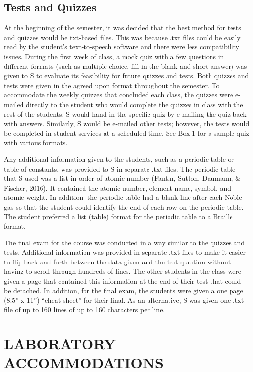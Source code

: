 \documentclass[11.5pt]{sig-alternate} %
\begin{document}
\begin{large}
\subsection*{Tests and Quizzes}

At the beginning of the semester, it was decided that the best method for tests and quizzes would be txt-based files.  This was because .txt files could be easily read by the student’s text-to-speech software and there were less compatibility issues.  During the first week of class, a mock quiz with a few questions in different formats (such as multiple choice, fill in the blank and short answer) was given to S to evaluate its feasibility for future quizzes and tests.  Both quizzes and tests were given in the agreed upon format throughout the semester.  To accommodate the weekly quizzes that concluded each class, the quizzes were e-mailed directly to the student who would complete the quizzes in class with the rest of the students.  S would hand in the specific quiz by e-mailing the quiz back with answers.  Similarly, S would be e-mailed other tests; however, the tests would be completed in student services at a scheduled time.  See Box 1 for a sample quiz with various formats.

Any additional information given to the students, such as a periodic table or table of constants, was provided to S in separate .txt files.  The periodic table that S used was a list in order of atomic number (Fantin, Sutton, Daumann, \& Fischer, 2016).  It contained the atomic number, element name, symbol, and atomic weight.  In addition, the periodic table had a blank line after each Noble gas so that the student could identify the end of each row on the periodic table.  The student preferred a list (table) format for the periodic table to a Braille format.

The final exam for the course was conducted in a way similar to the quizzes and tests.  Additional information was provided in separate .txt files to make it easier to flip back and forth between the data given and the test question without having to scroll through hundreds of lines.  The other students in the class were given a page that contained this information at the end of their test that could be detached.  In addition, for the final exam, the students were given a one page (8.5” x 11”) “cheat sheet” for their final.  As an alternative, S was given one .txt file of up to 160 lines of up to 160 characters per line.  

\section*{LABORATORY ACCOMMODATIONS}


\end{large}
\end{document}
